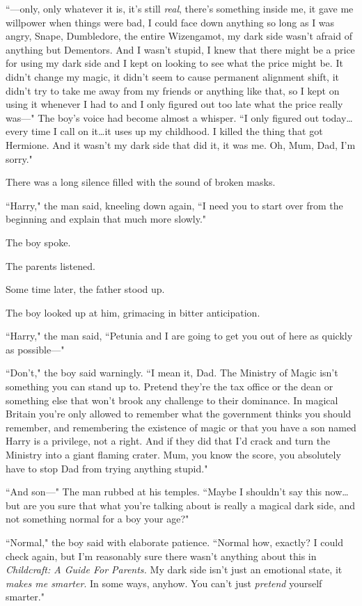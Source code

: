 ``—only, only whatever it is, it's still \emph{real}, there's something inside me, it gave me willpower when things were bad, I could face down anything so long as I was angry, Snape, Dumbledore, the entire Wizengamot, my dark side wasn't afraid of anything but Dementors. And I wasn't stupid, I knew that there might be a price for using my dark side and I kept on looking to see what the price might be. It didn't change my magic, it didn't seem to cause permanent alignment shift, it didn't try to take me away from my friends or anything like that, so I kept on using it whenever I had to and I only figured out too late what the price really was—" The boy's voice had become almost a whisper. ``I only figured out today…every time I call on it…it uses up my childhood. I killed the thing that got Hermione. And it wasn't my dark side that did it, it was me. Oh, Mum, Dad, I'm sorry."

There was a long silence filled with the sound of broken masks.

``Harry," the man said, kneeling down again, ``I need you to start over from the beginning and explain that much more slowly."

The boy spoke.

The parents listened.

Some time later, the father stood up.

The boy looked up at him, grimacing in bitter anticipation.

``Harry," the man said, ``Petunia and I are going to get you out of here as quickly as possible—"

``Don't," the boy said warningly. ``I mean it, Dad. The Ministry of Magic isn't something you can stand up to. Pretend they're the tax office or the dean or something else that won't brook any challenge to their dominance. In magical Britain you're only allowed to remember what the government thinks you should remember, and remembering the existence of magic or that you have a son named Harry is a privilege, not a right. And if they did that I'd crack and turn the Ministry into a giant flaming crater. Mum, you know the score, you absolutely have to stop Dad from trying anything stupid."

``And son—" The man rubbed at his temples. ``Maybe I shouldn't say this now…but are you sure that what you're talking about is really a magical dark side, and not something normal for a boy your age?"

``Normal," the boy said with elaborate patience. ``Normal how, exactly? I could check again, but I'm reasonably sure there wasn't anything about this in \emph{Childcraft: A Guide For Parents.} My dark side isn't just an emotional state, it \emph{makes me smarter}. In some ways, anyhow. You can't just \emph{pretend} yourself smarter."

